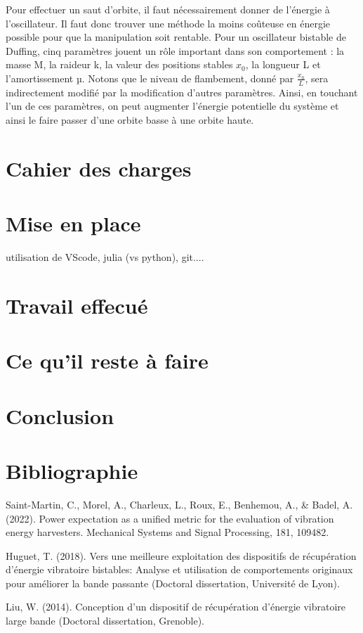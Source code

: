 \documentclass[a4paper, french, 12pt, titlepage]{report}
\begin{document}
Pour effectuer un saut d'orbite, il faut nécessairement donner de l'énergie à l'oscillateur. Il faut donc trouver une méthode la moins coûteuse en énergie possible pour que la manipulation soit rentable. Pour un oscillateur bistable de Duffing, cinq paramètres jouent un rôle important dans son comportement : la masse M, la raideur k, la valeur des positions stables $x_0$, la longueur L et l'amortissement µ. Notons que le niveau de flambement, donné par $\frac{x_0}{L}$, sera indirectement modifié par la modification d'autres paramètres. Ainsi, en touchant l'un de ces paramètres, on peut augmenter l'énergie potentielle du système et ainsi le faire passer d'une orbite basse à une orbite haute. 


\section{Cahier des charges}

\section{Mise en place}
utilisation de VScode, julia (vs python), git.... 

\section{Travail effecué}

\section{Ce qu'il reste à faire}

\section{Conclusion}



\section*{Bibliographie}

Saint-Martin, C., Morel, A., Charleux, L., Roux, E., Benhemou, A., & Badel, A. (2022). Power expectation as a unified metric for the evaluation of vibration energy harvesters. Mechanical Systems and Signal Processing, 181, 109482.

Huguet, T. (2018). Vers une meilleure exploitation des dispositifs de récupération d’énergie vibratoire bistables: Analyse et utilisation de comportements originaux pour améliorer la bande passante (Doctoral dissertation, Université de Lyon).

Liu, W. (2014). Conception d'un dispositif de récupération d'énergie vibratoire large bande (Doctoral dissertation, Grenoble).

	
\end{document}
